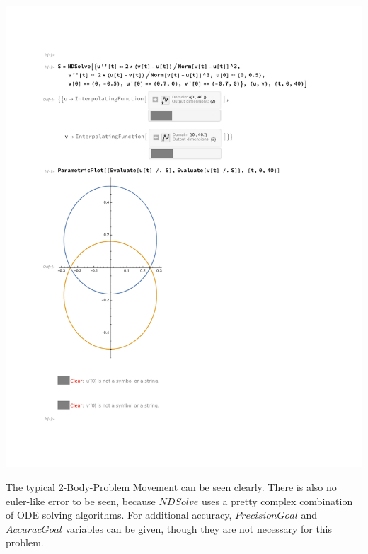 \documentclass[12pt, a4paper]{article}
\begin{document}
  \includegraphics[scale=0.6, page=1, trim=0 200 0 0, clip]{2body.pdf}

  The typical 2-Body-Problem Movement can be seen clearly. There is also no euler-like error to be seen, because $NDSolve$ uses a pretty complex combination of ODE solving algorithms. For additional accuracy, $PrecisionGoal$ and $AccuracGoal$ variables can be given, though they are not necessary for this problem.
\end{document}
